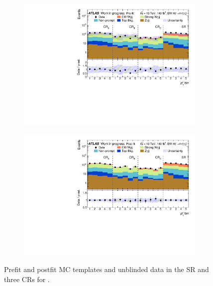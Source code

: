 
\begin{figure}[H]
\centering
\begin{subfigure}[b]{\textwidth}
    \centering
    \includegraphics[width=\textwidth]{plots/diffx/stacks/preFit_stack_lep_pt_WIP_12Feb.pdf}
    \caption{}
\end{subfigure}
\hfill
\begin{subfigure}[b]{\textwidth}
    \centering
    \includegraphics[width=\textwidth]{plots/diffx/stacks/postFit_stack_lep_pt_WIP_12Feb.pdf}
    \caption{}
\end{subfigure}
\caption{Prefit and postfit MC templates and unblinded data in the SR and three CRs for \leppt.}
\label{fig:leppt_templates}
\end{figure}


